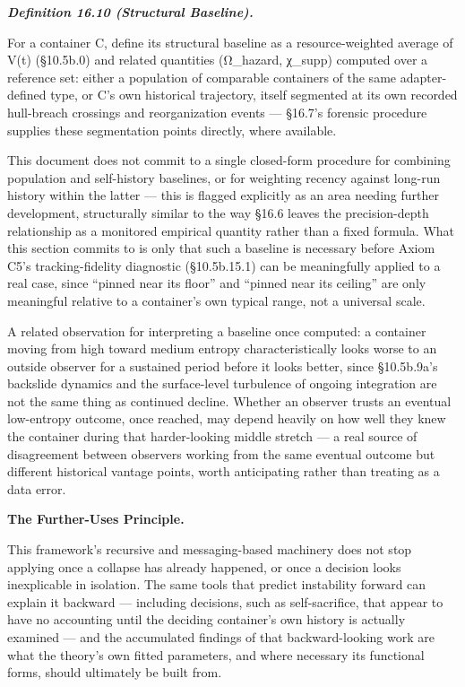 \documentclass[
]{article}
\begin{document}
\emph{\textbf{Definition 16.10 (Structural Baseline).}}

For a container C, define its structural baseline as a resource-weighted
average of V(t) (§10.5b.0) and related quantities (Ω\_hazard, χ\_supp)
computed over a reference set: either a population of comparable
containers of the same adapter-defined type, or C's own historical
trajectory, itself segmented at its own recorded hull-breach crossings
and reorganization events --- §16.7's forensic procedure supplies these
segmentation points directly, where available.

This document does not commit to a single closed-form procedure for
combining population and self-history baselines, or for weighting
recency against long-run history within the latter --- this is flagged
explicitly as an area needing further development, structurally similar
to the way §16.6 leaves the precision-depth relationship as a monitored
empirical quantity rather than a fixed formula. What this section
commits to is only that such a baseline is necessary before Axiom C5's
tracking-fidelity diagnostic (§10.5b.15.1) can be meaningfully applied
to a real case, since ``pinned near its floor'' and ``pinned near its
ceiling'' are only meaningful relative to a container's own typical
range, not a universal scale.

A related observation for interpreting a baseline once computed: a
container moving from high toward medium entropy characteristically
looks worse to an outside observer for a sustained period before it
looks better, since §10.5b.9a's backslide dynamics and the surface-level
turbulence of ongoing integration are not the same thing as continued
decline. Whether an observer trusts an eventual low-entropy outcome,
once reached, may depend heavily on how well they knew the container
during that harder-looking middle stretch --- a real source of
disagreement between observers working from the same eventual outcome
but different historical vantage points, worth anticipating rather than
treating as a data error.

\textbf{The Further-Uses Principle.}

This framework's recursive and messaging-based machinery does not stop
applying once a collapse has already happened, or once a decision looks
inexplicable in isolation. The same tools that predict instability
forward can explain it backward --- including decisions, such as
self-sacrifice, that appear to have no accounting until the deciding
container's own history is actually examined --- and the accumulated
findings of that backward-looking work are what the theory's own fitted
parameters, and where necessary its functional forms, should ultimately
be built from.
\end{document}
